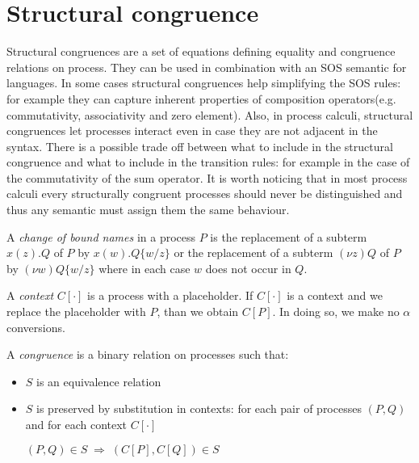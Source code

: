 \section{Structural congruence}

Structural congruences are a set of equations defining equality and congruence relations on process. They can be used in combination with an SOS semantic for languages. In some cases structural congruences help simplifying the SOS rules: for example they can capture inherent properties of composition operators(e.g. commutativity, associativity and zero element). Also, in process calculi, structural congruences let processes interact even in case they are not adjacent in the syntax. There is a possible trade off between what to include in the structural congruence and what to include in the transition rules: for example in the case of the commutativity of the sum operator. It is worth noticing that in most process calculi every structurally congruent processes should never be distinguished and thus any semantic must assign them the same behaviour.


\begin{definition}
  A \emph{change of bound names} in a process $P$ is the replacement of a subterm $x(z).Q$ of $P$ by $x(w).Q\{w/z\}$ or the replacement of a subterm $(\nu z)Q$ of $P$ by $(\nu w)Q\{w/z\}$ where in each case $w$ does not occur in $Q$.
\end{definition}


\begin{definition}
  A \emph{context} $C[\cdot]$ is a process with a placeholder. If $C[\cdot]$ is a context and we replace the placeholder with $P$, than we obtain $C[P]$. In doing so, we make no $\alpha$ conversions.
\end{definition}


\begin{definition}
  A \emph{congruence} is a binary relation on processes such that:
  \begin{itemize}
    \item 
      $S$ is an equivalence relation
    \item 
      $S$ is preserved by substitution in contexts: for each pair of processes $(P, Q)$ and for each context $C[\cdot]$
      \begin{center}
	$(P,Q)\in S\; \Rightarrow\; (C[P], C[Q])\in S$
      \end{center}
  \end{itemize}
\end{definition}

